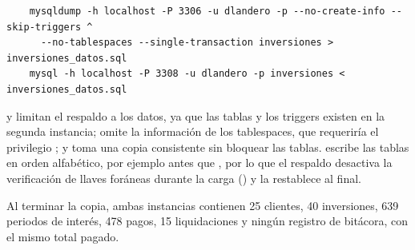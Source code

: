 \begin{verbatim}
	mysqldump -h localhost -P 3306 -u dlandero -p --no-create-info --skip-triggers ^
	  --no-tablespaces --single-transaction inversiones > inversiones_datos.sql
	mysql -h localhost -P 3308 -u dlandero -p inversiones < inversiones_datos.sql
\end{verbatim}

 y  limitan el respaldo a los datos, ya que las tablas y los triggers existen en la segunda instancia;  omite la información de los tablespaces, que requeriría el privilegio ; y  toma una copia consistente sin bloquear las tablas.  escribe las tablas en orden alfabético, por ejemplo  antes que , por lo que el respaldo desactiva la verificación de llaves foráneas durante la carga () y la restablece al final.

Al terminar la copia, ambas instancias contienen 25 clientes, 40 inversiones, 639 periodos de interés, 478 pagos, 15 liquidaciones y ningún registro de bitácora, con el mismo total pagado.
